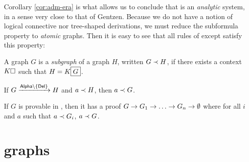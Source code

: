 Corollary \ref{cor:adm-era} is what allows us to conclude that  is an
\emph{analytic} system, in a sense very close to that of Gentzen. Because we do
not have a notion of logical connective nor tree-shaped derivations, we must
reduce the subformula property to \emph{atomic} graphs. Then it is easy to see
that all rules of  except  satisfy this property:

\begin{definition}[Subgraph]
  A graph $G$ is a \emph{subgraph} of a graph $H$, written $G \prec H$, if
  there exists a context $K\square$ such that $H = K\fbox{$G$}$.
\end{definition}

\begin{fact}
  If $G \xstep{\msys{Alpha} \setminus \{\mathsf{Del}\}} H$ and $a \prec H$,
  then $a \prec G$.
\end{fact}

\begin{corollary}[Analyticity]
  If $G$ is provable in , then it has a proof $G \rightarrow G_1 \rightarrow
  \ldots \rightarrow G_n \rightarrow \emptyset$ where for all $i$ and $a$ such that $a
  \prec G_i$, $a \prec G$.
\end{corollary}




\section{ graphs}


